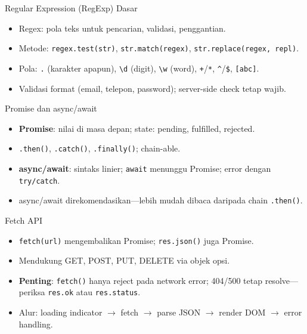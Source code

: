 \documentclass[handout]{beamer}
\begin{document}
\begin{frame}{Regular Expression (RegExp) Dasar}
	\begin{itemize}
		\item Regex: pola teks untuk pencarian, validasi, penggantian.
		\item Metode: \texttt{regex.test(str)}, \texttt{str.match(regex)}, \texttt{str.replace(regex, repl)}.
		\item Pola: \texttt{.} (karakter apapun), \texttt{\textbackslash d} (digit), \texttt{\textbackslash w} (word), \texttt{+}/\texttt{*}, \texttt{\^{}}/\texttt{\$}, \texttt{[abc]}.
		\item Validasi format (email, telepon, password); server-side check tetap wajib.
	\end{itemize}
\end{frame}

\begin{frame}{Promise dan async/await}
	\begin{itemize}
		\item \textbf{Promise}: nilai di masa depan; state: pending, fulfilled, rejected.
		\item \texttt{.then()}, \texttt{.catch()}, \texttt{.finally()}; chain-able.
		\item \textbf{async/await}: sintaks linier; \texttt{await} menunggu Promise; error dengan \texttt{try/catch}.
		\item async/await direkomendasikan---lebih mudah dibaca daripada chain \texttt{.then()}.
	\end{itemize}
\end{frame}

\begin{frame}{Fetch API}
	\begin{itemize}
		\item \texttt{fetch(url)} mengembalikan Promise; \texttt{res.json()} juga Promise.
		\item Mendukung GET, POST, PUT, DELETE via objek opsi.
		\item \textbf{Penting}: \texttt{fetch()} hanya reject pada network error; 404/500 tetap resolve---periksa \texttt{res.ok} atau \texttt{res.status}.
		\item Alur: loading indicator $\to$ fetch $\to$ parse JSON $\to$ render DOM $\to$ error handling.
	\end{itemize}
\end{frame}
\end{document}
